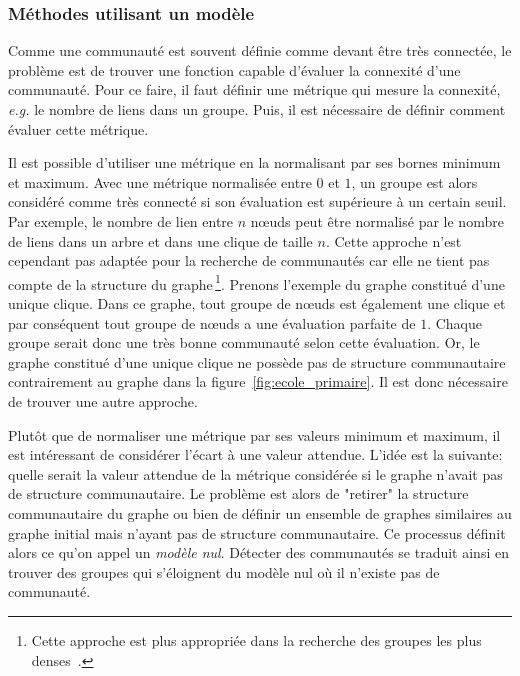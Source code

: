 \subsubsection{Méthodes utilisant un modèle}
\label{def:Modularite}
Comme une communauté est souvent définie comme devant être très connectée, le problème est de trouver une fonction capable d'évaluer la connexité d'une communauté.
Pour ce faire, il faut définir une métrique qui mesure la connexité, \emph{e.g.} le nombre de liens dans un groupe.
Puis, il est nécessaire de définir comment évaluer cette métrique.

Il est possible d'utiliser une métrique en la normalisant par ses bornes minimum et maximum.
Avec une métrique normalisée entre $0$ et $1$, un groupe est alors considéré comme très connecté si son évaluation est supérieure à un certain seuil.
Par exemple, le nombre de lien entre $n$ n\oe uds peut être normalisé par le nombre de liens dans un arbre et dans une clique de taille $n$. 
Cette approche n'est cependant pas adaptée pour la recherche de communautés car elle ne tient pas compte de la structure du graphe\,\footnote{Cette approche est plus appropriée dans la recherche des groupes les plus denses~\cite{Balalau2015}.}.
Prenons l'exemple du graphe constitué d'une unique clique.
Dans ce graphe, tout groupe de n\oe uds est également une clique et par conséquent tout groupe de n\oe uds a une évaluation parfaite de $1$.
Chaque groupe serait donc une très bonne communauté selon cette évaluation.
Or, le graphe constitué d'une unique clique ne possède pas de structure communautaire contrairement au graphe dans la figure~\ref{fig:ecole_primaire}.
Il est donc nécessaire de trouver une autre approche.

\bigskip

Plutôt que de normaliser une métrique par ses valeurs minimum et maximum, il est intéressant de considérer l'écart à une valeur attendue.
L'idée est la suivante: quelle serait la valeur attendue de la métrique considérée si le graphe n'avait pas de structure communautaire.
Le problème est alors de "retirer" la structure communautaire du graphe ou bien de définir un ensemble de graphes similaires au graphe initial mais n'ayant pas de structure communautaire.
Ce processus définit alors ce qu'on appel un \emph{modèle nul}.
Détecter des communautés se traduit ainsi en trouver des groupes qui s'éloignent du modèle nul où il n'existe pas de communauté.

